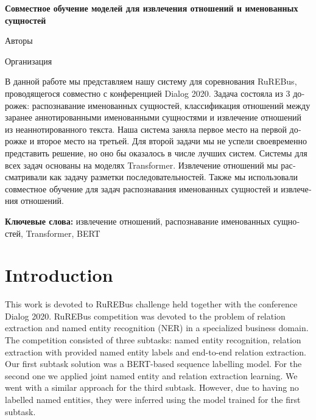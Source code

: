 \documentclass{dialogue}
\begin{document}
	\begin{otherlanguage}{russian}
		\begin{center}
			{\Large\bfseries{Совместное обучение моделей для извлечения отношений и именованных сущностей}}
			
			\medskip
			
			Авторы
			
			\medskip
			
			Организация
		\end{center}
		
		В данной работе мы представляем нашу систему для соревнования RuREBus, проводящегося совместно с конференцией Dialog 2020. Задача состояла из 3 дорожек: распознавание именованных сущностей, классификация отношений между заранее аннотированными именованными сущностями и извлечение отношений из неаннотированного текста. Наша система заняла первое место на первой дорожке и второе место на третьей. Для второй задачи мы не успели своевременно представить решение, но оно бы оказалось в числе лучших систем. Системы для всех задач основаны на моделях Transformer. Извлечение отношений мы рассматривали как задачу разметки последовательностей. Также мы использовали совместное обучение для задач распознавания именованных сущностей и извлечения отношений.
		
		\medskip
		
		\textbf{Ключевые слова:} извлечение отношений, распознавание именованных сущностей, Transformer, BERT
	\end{otherlanguage}
	
	
	\section{Introduction}
	This work is devoted to RuREBus challenge held together with the conference Dialog 2020. RuREBus competition was devoted to the problem of relation extraction and named entity recognition (NER) in a specialized business domain. The competition consisted of three subtasks: named entity recognition, relation extraction with provided named entity labels and end-to-end relation extraction. Our first subtask solution was a BERT-based \cite{bert} sequence labelling model. For the second one we applied joint named entity and relation extraction learning. We went with a similar approach for the third subtask. However, due to having no labelled named entities, they were inferred using the model trained for the first subtask.
	
\end{document}
